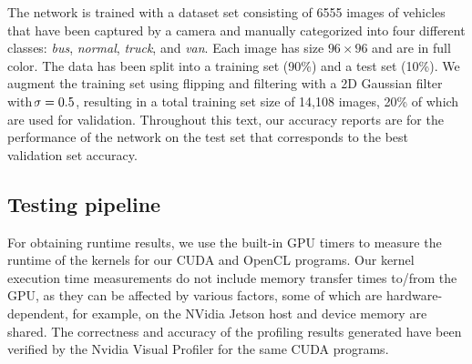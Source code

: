 \documentclass[conference,compsoc]{IEEEtran}
\newcommand{\jani}[1]{\textcolor{red}{\textbf{[Jani: #1]}}}
\newcommand{\response}[1]{\textcolor{darkgreen}{#1}}
\begin{document}
The network is trained with a dataset set consisting of 6555 images of vehicles that have been captured by a camera and manually categorized into four different classes: \textit{bus}, \textit{normal}, \textit{truck}, and \textit{van}. Each image has size $96\times 96$ and are in full color. The data has been split into a training set (90\%) and a test set (10\%).  We augment the training set using flipping and filtering with a 2D Gaussian filter with $\hspace {-0.8mm} \sigma=  0.5$, resulting in a total training set size of 14,108 images, 20\% of which are used for validation. Throughout this text, our accuracy reports are for the performance of the network on the test set that corresponds to the best validation set accuracy.


\subsection{Testing pipeline}


For obtaining runtime results, we use the built-in GPU timers to measure the runtime of the kernels for our CUDA and OpenCL programs. Our kernel execution time measurements do not include memory transfer times to/from the GPU, as they can be affected by various factors, some of which are hardware-dependent, for example, on the NVidia Jetson host and device memory are shared. The correctness and accuracy of the profiling results generated have been verified by the Nvidia Visual Profiler for the same CUDA programs.
\end{document}
